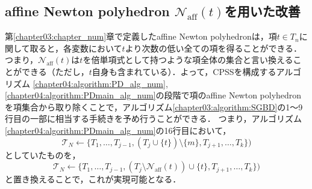 \subsection{affine Newton polyhedron $\mathcal{N}_{\mathrm{aff}}(t)$を用いた改善}
\label{chapter04:subsection:section_num}
第\ref{chapter03:chapter_num}章で定義したaffine Newton polyhedronは，項$t \in T_n$に関して取ると，各変数において$t$より次数の低い全ての項を得ることができる．つまり，$\mathcal{N}_{\mathrm{aff}}(t)$は$t$を倍単項式として持つような項全体の集合と言い換えることができる（ただし，$t$自身も含まれている）．よって，CPSSを構成するアルゴリズム \ref{chapter04:algorithm:PD_alg_num}, \ref{chapter04:algorithm:PDmain_alg_num}の段階で項のaffine Newton polyhedronを項集合から取り除くことで，アルゴリズム\ref{chapter03:algorithm:SGBD}の1〜9行目の一部に相当する手続きを予め行うことができる．
つまり，アルゴリズム\ref{chapter04:algorithm:PDmain_alg_num}の16行目において，
$$\mathscr{T}_N \gets \{ T_1, \dots, T_{j-1}, (T_j \cup \{ t \}) \setminus \{ m \}, T_{j+1}, \dots, T_k \})$$
としていたものを，
$$\mathscr{T}_N \gets \{ T_1, \dots, T_{j-1}, (T_j \setminus \mathcal{N}_{\mathrm{aff}}(t))\cup \{ t \}, T_{j+1}, \dots, T_k \})$$
と置き換えることで，これが実現可能となる．

